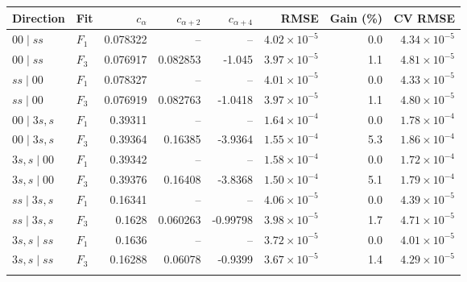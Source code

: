 \begin{tabular}{llrrrrrr}\toprule
Direction & Fit & $c_{\alpha}$ & $c_{\alpha+2}$ & $c_{\alpha+4}$ & RMSE & Gain (\%) & CV RMSE\\\midrule
$00\mid ss$ & $F_1$ & 0.078322 & -- & -- & $4.02\!\times\!10^{-5}$ & 0.0 & $4.34\!\times\!10^{-5}$ \\
$00\mid ss$ & $F_3$ & 0.076917 & 0.082853 & -1.045 & $3.97\!\times\!10^{-5}$ & 1.1 & $4.81\!\times\!10^{-5}$ \\
\addlinespace[2pt]
$ss\mid 00$ & $F_1$ & 0.078327 & -- & -- & $4.01\!\times\!10^{-5}$ & 0.0 & $4.33\!\times\!10^{-5}$ \\
$ss\mid 00$ & $F_3$ & 0.076919 & 0.082763 & -1.0418 & $3.97\!\times\!10^{-5}$ & 1.1 & $4.80\!\times\!10^{-5}$ \\
\addlinespace[2pt]
$00\mid 3s,s$ & $F_1$ & 0.39311 & -- & -- & $1.64\!\times\!10^{-4}$ & 0.0 & $1.78\!\times\!10^{-4}$ \\
$00\mid 3s,s$ & $F_3$ & 0.39364 & 0.16385 & -3.9364 & $1.55\!\times\!10^{-4}$ & 5.3 & $1.86\!\times\!10^{-4}$ \\
\addlinespace[2pt]
$3s,s\mid 00$ & $F_1$ & 0.39342 & -- & -- & $1.58\!\times\!10^{-4}$ & 0.0 & $1.72\!\times\!10^{-4}$ \\
$3s,s\mid 00$ & $F_3$ & 0.39376 & 0.16408 & -3.8368 & $1.50\!\times\!10^{-4}$ & 5.1 & $1.79\!\times\!10^{-4}$ \\
\addlinespace[2pt]
$ss\mid 3s,s$ & $F_1$ & 0.16341 & -- & -- & $4.06\!\times\!10^{-5}$ & 0.0 & $4.39\!\times\!10^{-5}$ \\
$ss\mid 3s,s$ & $F_3$ & 0.1628 & 0.060263 & -0.99798 & $3.98\!\times\!10^{-5}$ & 1.7 & $4.71\!\times\!10^{-5}$ \\
\addlinespace[2pt]
$3s,s\mid ss$ & $F_1$ & 0.1636 & -- & -- & $3.72\!\times\!10^{-5}$ & 0.0 & $4.01\!\times\!10^{-5}$ \\
$3s,s\mid ss$ & $F_3$ & 0.16288 & 0.06078 & -0.9399 & $3.67\!\times\!10^{-5}$ & 1.4 & $4.29\!\times\!10^{-5}$ \\
\addlinespace[2pt]
\bottomrule\end{tabular}
